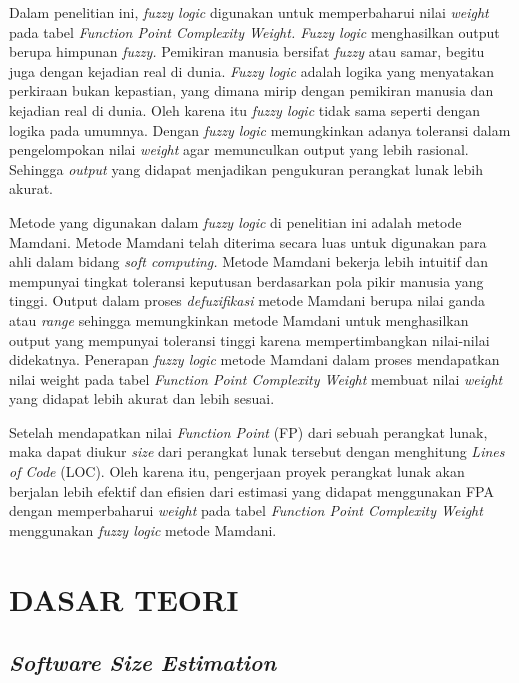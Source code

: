 \documentclass[a4paper]{article}
\begin{document}
\begin{multicols}{2}
\par Dalam penelitian ini, \textit{fuzzy logic} digunakan untuk memperbaharui nilai \textit{weight} pada tabel \textit{Function Point Complexity Weight. Fuzzy logic} menghasilkan output berupa himpunan \textit{fuzzy.} Pemikiran manusia bersifat \textit{fuzzy} atau samar, begitu juga dengan kejadian real di dunia. \textit{Fuzzy logic} adalah logika yang menyatakan perkiraan bukan kepastian, yang dimana mirip dengan pemikiran manusia dan kejadian real di dunia. Oleh karena itu \textit{fuzzy logic} tidak sama seperti dengan logika pada umumnya\citep{Elamvazuthi2009}. Dengan \textit{fuzzy logic} memungkinkan adanya toleransi dalam pengelompokan nilai \textit{weight} agar memunculkan output yang lebih rasional. Sehingga \textit{output} yang didapat menjadikan pengukuran perangkat lunak lebih akurat.

\par Metode yang digunakan dalam \textit{fuzzy logic} di penelitian ini adalah metode Mamdani. Metode Mamdani telah diterima secara luas untuk digunakan para ahli dalam bidang \textit{soft computing.} Metode Mamdani bekerja lebih intuitif dan mempunyai tingkat toleransi keputusan berdasarkan pola pikir manusia yang tinggi\citep{Kaur2012}. Output dalam proses \textit{defuzifikasi} metode Mamdani berupa nilai ganda atau \textit{range} sehingga memungkinkan metode Mamdani untuk menghasilkan output yang mempunyai toleransi tinggi karena mempertimbangkan nilai-nilai didekatnya. Penerapan \textit{fuzzy logic} metode Mamdani dalam proses mendapatkan nilai weight pada tabel \textit{Function Point Complexity Weight} membuat nilai \textit{weight} yang didapat lebih akurat dan lebih sesuai.

\par Setelah mendapatkan nilai \textit{Function Point} (FP) dari sebuah perangkat lunak, maka dapat diukur \textit{size} dari perangkat lunak tersebut dengan menghitung \textit{Lines of Code} (LOC). Oleh karena itu, pengerjaan proyek perangkat lunak akan berjalan lebih efektif dan efisien dari estimasi yang didapat menggunakan FPA dengan memperbaharui \textit{weight} pada tabel \textit{Function Point Complexity Weight} menggunakan \textit{fuzzy logic} metode Mamdani.

\section{DASAR TEORI}

\subsection{\textit{Software Size Estimation}}


\end{multicols}
\end{document}
